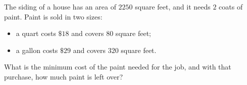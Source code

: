 The siding of a house has an area of $2250$ square feet, and it needs $2$ coats of paint. Paint is sold in two sizes:
\begin{itemize}
\item a quart costs $\$18$ and covers $80$ square feet;
\item a gallon costs $\$29$ and covers $320$ square feet.
\end{itemize}
What is the minimum cost of the paint needed for the job, and with that purchase, how much paint is left over?
